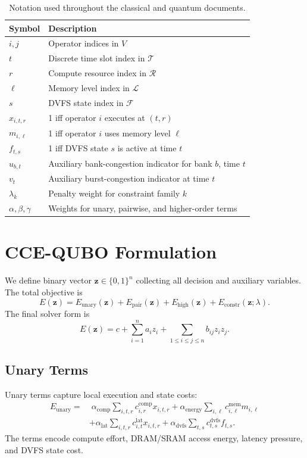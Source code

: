 \documentclass{article}
\begin{document}
\begin{table}[t]
\centering
\caption{Notation used throughout the classical and quantum documents.}
\begin{tabular}{ll}
\toprule
Symbol & Description \\
\midrule
$i,j$ & Operator indices in $V$ \\
$t$ & Discrete time slot index in $\mathcal{T}$ \\
$r$ & Compute resource index in $\mathcal{R}$ \\
$\ell$ & Memory level index in $\mathcal{L}$ \\
$s$ & DVFS state index in $\mathcal{F}$ \\
$x_{i,t,r}$ & 1 iff operator $i$ executes at $(t,r)$ \\
$m_{i,\ell}$ & 1 iff operator $i$ uses memory level $\ell$ \\
$f_{t,s}$ & 1 iff DVFS state $s$ is active at time $t$ \\
$u_{b,t}$ & Auxiliary bank-congestion indicator for bank $b$, time $t$ \\
$v_t$ & Auxiliary burst-congestion indicator at time $t$ \\
$\lambda_k$ & Penalty weight for constraint family $k$ \\
$\alpha,\beta,\gamma$ & Weights for unary, pairwise, and higher-order terms \\
\bottomrule
\end{tabular}
\end{table}

\section{CCE-QUBO Formulation}
We define binary vector $\mathbf{z}\in\{0,1\}^n$ collecting all decision and auxiliary variables. The total objective is
\begin{equation}
E(\mathbf{z}) = E_{\text{unary}}(\mathbf{z}) + E_{\text{pair}}(\mathbf{z}) + E_{\text{high}}(\mathbf{z}) + E_{\text{constr}}(\mathbf{z};\lambda).
\end{equation}
The final solver form is
\begin{equation}
E(\mathbf{z}) = c + \sum_{i=1}^{n} a_i z_i + \sum_{1\le i\le j\le n} b_{ij} z_i z_j.
\end{equation}

\subsection{Unary Terms}
Unary terms capture local execution and state costs:
\begin{align}
E_{\text{unary}} =
&\;\alpha_{\mathrm{comp}}\sum_{i,t,r} c^{\mathrm{comp}}_{i,r}x_{i,t,r}
+ \alpha_{\mathrm{energy}}\sum_{i,\ell} c^{\mathrm{mem}}_{i,\ell}m_{i,\ell} \\
&+ \alpha_{\mathrm{lat}}\sum_{i,t,r} c^{\mathrm{lat}}_{i,t}x_{i,t,r}
+ \alpha_{\mathrm{dvfs}}\sum_{t,s} c^{\mathrm{dvfs}}_{t,s}f_{t,s}.
\end{align}
The terms encode compute effort, DRAM/SRAM access energy, latency pressure, and DVFS state cost.
\end{document}
